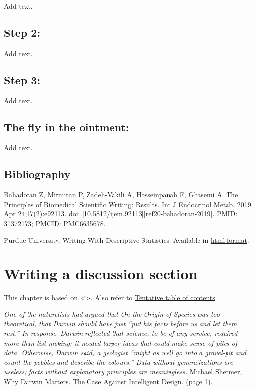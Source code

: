 \documentclass[
  letterpaper,
  DIV=11,
  numbers=noendperiod]{scrreprt}
\begin{document}
\begin{tcolorbox}
Add text.

\section{Step 2:}\label{step-2}

Add text.

\section{Step 3:}\label{step-3}

Add text.

\section{The fly in the ointment:}\label{the-fly-in-the-ointment-5}

Add text.

\section{Bibliography}\label{bibliography-19}

Bahadoran Z, Mirmiran P, Zadeh-Vakili A, Hosseinpanah F, Ghasemi A. The
Principles of Biomedical Scientific Writing: Results. Int J Endocrinol
Metab. 2019 Apr 24;17(2):e92113. doi:
{[}10.5812/ijem.92113{]}{[}ref20-bahadoran-2019{]}. PMID: 31372173;
PMCID: PMC6635678.

Purdue University. Writing With Descriptive Statistics. Available in
\href{https://owl.purdue.edu/owl/research_and_citation/using_research/writing_with_statistics/writing_with_descriptive_statistics.html}{html
format}.


\chapter{Writing a discussion
section}\label{writing-a-discussion-section}

This chapter is based on \textless{}\textgreater. Also refer to
\href{http://www.pmean.com/10/Contents.html}{Tentative table of
contents}.

\emph{One of the naturalists had argued that On the Origin of Species
was too theoretical, that Darwin should have just ``put his facts before
us and let them rest.'' In response, Darwin reflected that science, to
be of any service, required more than list making; it needed larger
ideas that could make sense of piles of data. Otherwise, Darwin said, a
geologist ``might as well go into a gravel-pit and count the pebbles and
describe the colours.'' Data without generalizations are useless; facts
without explanatory principles are meaningless.} Michael Shermer, Why
Darwin Matters. The Case Against Intelligent Design. (page 1).


\end{tcolorbox}
\end{document}
